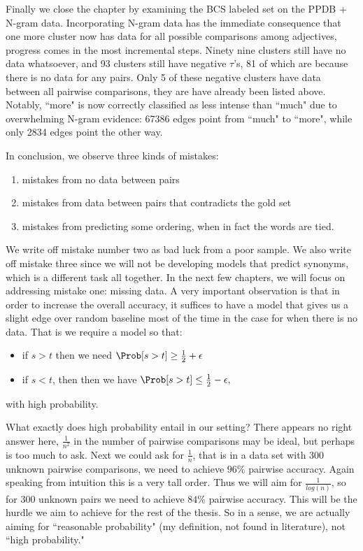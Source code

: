 Finally we close the chapter by examining the BCS labeled set on the PPDB + N-gram data. Incorporating N-gram data has the immediate consequence that one more cluster now has data for all possible comparisons among adjectives, progress comes in the most incremental steps. Ninety nine clusters still have no data whatsoever, and 93 clusters still have negative $\tau$'s, 81 of which are because there is no data for any pairs. Only 5 of these negative clusters have data between all pairwise comparisons, they are have already been listed above. Notably, ``more" is now correctly classified as less intense than ``much" due to overwhelming N-gram evidence: 67386 edges point from ``much" to ``more", while only 2834 edges point the other way. 

In conclusion, we observe three kinds of mistakes:

\begin{enumerate}
	\item mistakes from no data between pairs
	\item mistakes from data between pairs that contradicts the gold set
	\item mistakes from predicting some ordering, when in fact the words are tied.
\end{enumerate}

We write off mistake number two as bad luck from a poor sample. We also write off mistake three since we will not be developing models that predict synonyms, which is a different task all together. In the next few chapters, we will focus on addressing mistake one: missing data. A very important observation is that in order to increase the overall accuracy, it suffices to have a model that gives us a slight edge over random baseline most of the time in the case for when there is no data. That is we require a model so that:

\begin{itemize}
	\item if $s > t$ then we need $\Prob[s > t] \geq \frac{1}{2} + \epsilon$
	\item if $s < t$, then then we have $\Prob[ s > t ] \leq \frac{1}{2} - \epsilon,$
\end{itemize}	

with high probability. 

\begin{remark}
	What exactly does high probability entail in our setting? There appears no right answer here, $\frac{1}{n^2}$ in the number of pairwise comparisons may be ideal, but perhaps is too much to ask. Next we could ask for $\frac{1}{n}$, that is in a data set with 300 unknown pairwise comparisons, we need to achieve $96\%$ pairwise accuracy. Again speaking from intuition this is a very tall order. Thus we will aim for $\frac{1}{log(n)}$, so for 300 unknown pairs we need to achieve $84\%$ pairwise accuracy. This will be the hurdle we aim to achieve for the rest of the thesis. So in a sense, we are actually aiming for ``reasonable probability" (my definition, not found in literature), not ``high probability."
\end{remark}


